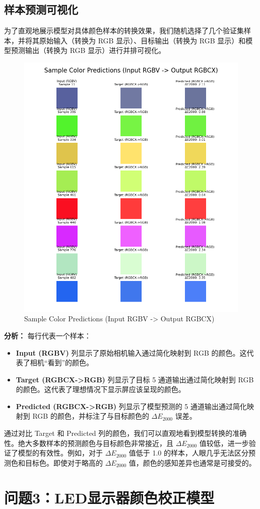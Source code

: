 \subsection[\hspace{-2pt}样本预测可视化]{{\heiti{} \hspace{-8pt}样本预测可视化}}\label{section2: 样本预测可视化}

为了直观地展示模型对具体颜色样本的转换效果，我们随机选择了几个验证集样本，并将其原始输入（转换为 RGB 显示）、目标输出（转换为 RGB 显示）和模型预测输出（转换为 RGB 显示）进行并排可视化。



\begin{figure}[h!]
\centering
{}
\includegraphics[width=0.8\columnwidth]{figures/Sample.png} %
\caption[Sample Color Predictions (Input RGBV -> Output RGBCX)]{Sample Color Predictions (Input RGBV -> Output RGBCX)}
\label{figure2: sample_predictions}
\end{figure}

\textbf{分析：}
每行代表一个样本：
\begin{itemize}
    \item \textbf{Input (RGBV)} 列显示了原始相机输入通过简化映射到 RGB 的颜色。这代表了相机“看到”的颜色。
    \item \textbf{Target (RGBCX->RGB)} 列显示了目标 5 通道输出通过简化映射到 RGB 的颜色。这代表了理想情况下显示屏应该呈现的颜色。
    \item \textbf{Predicted (RGBCX->RGB)} 列显示了模型预测的 5 通道输出通过简化映射到 RGB 的颜色，并标注了与目标颜色的 $\Delta E_{2000}$ 误差。
\end{itemize}
通过对比 Target 和 Predicted 列的颜色，我们可以直观地看到模型转换的准确性。绝大多数样本的预测颜色与目标颜色非常接近，且 $\Delta E_{2000}$ 值较低，进一步验证了模型的有效性。例如，对于 $\Delta E_{2000}$ 值低于 1.0 的样本，人眼几乎无法区分预测色和目标色。即使对于略高的 $\Delta E_{2000}$ 值，颜色的感知差异也通常是可接受的。

\section[\hspace{-2pt}问题3：LED显示器颜色校正模型]{{\heiti{} \hspace{-8pt}问题3：LED显示器颜色校正模型}}\label{section3: 问题3：LED显示器颜色校正模型}
